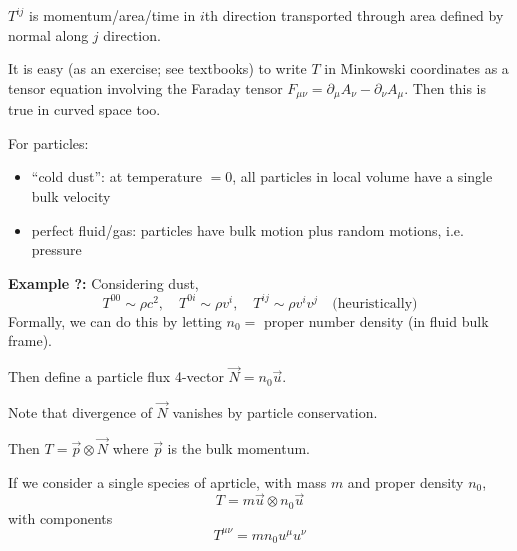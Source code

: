 \documentclass[a4paper]{article} %
\newcommand{\example}[2]
{
\begin{framed}
\textbf{Example #1:} #2
\end{framed}
}
\begin{document}
$T^{ij}$ is momentum/area/time in $i$th direction transported through area defined by normal along $j$ direction.

It is easy (as an exercise; see textbooks) to write $T$ in Minkowski coordinates as a tensor equation involving the Faraday tensor 
$F_{\mu\nu} = \partial_\mu A_{\nu}-\partial_{\nu}A_{\mu}$. Then this is true in curved space too.

For particles:
\begin{itemize}
\item ``cold dust'': at temperature $=0$, all particles in local volume have a single bulk velocity
\item perfect fluid/gas: particles have bulk motion plus random motions, i.e. pressure
\end{itemize}

\example{?}{
Considering dust,
\begin{equation}
T^{00}\sim \rho c^2,\quad T^{0i}\sim \rho v^{i}, \quad T^{ij}\sim \rho v^{i} v^{j}\quad \text{(heuristically)}
\end{equation}
Formally, we can do this by letting $n_0=$ proper number density (in fluid bulk frame). 

Then define a particle flux 4-vector $\vec{N}=n_0\vec{u}$. 

Note that divergence of $\vec{N}$ vanishes by particle conservation.

Then $T=\vec{p} \otimes \vec{N}$ where $\vec{p}$ is the bulk momentum.

If we consider a single species of aprticle, with mass $m$ and proper density $n_0$,
\begin{equation}
T=m\vec{u}\otimes n_0\vec{u}
\end{equation}
with components
\begin{equation}
T^{\mu\nu}=m n_0 u^{\mu} u^{\nu}
\end{equation}
}
\end{document}
